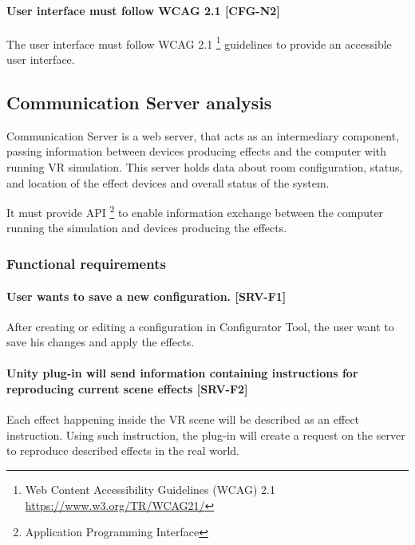 \hypertarget{x-\textbf{user-interface-must-follow-wcag-2.1}-[cfg-n2]}{\paragraph*{\textbf{User interface must follow WCAG 2.1} [CFG-N2]}}
The user interface must follow WCAG 2.1
\footnote{Web Content Accessibility Guidelines (WCAG) 2.1 \href{https://www.w3.org/TR/WCAG21/}{https://www.w3.org/TR/WCAG21/}}
guidelines to provide an accessible user interface.


\hypertarget{x-communication-server-analysis}{\subsection*{Communication Server analysis}}
Communication Server is a web server, that acts as an intermediary component,
passing information between devices producing effects and the computer with
running VR simulation. This server holds data about room configuration,
status, and location of the effect devices and overall status of the system.


It must provide API \footnote{Application Programming Interface} to enable
information exchange between the computer running the simulation and devices
producing the effects.


\hypertarget{x-functional-requirements}{\subsubsection*{Functional requirements}}
\hypertarget{x-\textbf{user-wants-to-save-a-new-configuration.}-[srv-f1]}{\paragraph*{\textbf{User wants to save a new configuration.} [SRV-F1]}}
After creating or editing a configuration in Configurator Tool, the user
want to save his changes and apply the effects.


\hypertarget{x-\textbf{unity-plug-in-will-send-information-containing-instructions-for-reproducing-current-scene-effects}-[srv-f2]}{\paragraph*{\textbf{Unity plug-in will send information containing instructions for reproducing current scene effects} [SRV-F2]}}
Each effect happening inside the VR scene will be described as an effect
instruction. Using such instruction, the plug-in will create a request on the server to
reproduce described effects in the real world.


